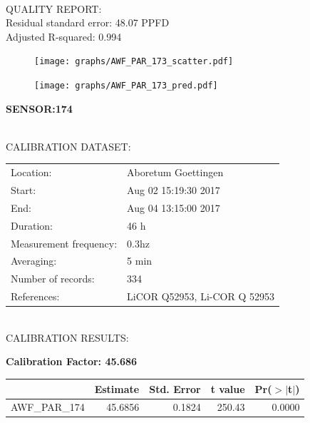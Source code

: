 \documentclass[oneside]{report}
\begin{document}
\hrulefill\\
QUALITY REPORT:\\
Residual standard error: 48.07 PPFD\\
Adjusted R-squared: 0.994



\begin{figure}[H]
  \centering
  \texttt{[image: graphs/AWF\_PAR\_173\_scatter.pdf]}
\end{figure}




\begin{figure}[H]
  \centering
  \texttt{[image: graphs/AWF\_PAR\_173\_pred.pdf]}
\end{figure}

\pagebreak


\begin{center}
\large{\textbf{SENSOR:174}}\\
\end{center}

\hrulefill\\
CALIBRATION DATASET:\\
\begin{table}[h!]
  \centering
  \label{tab:table1}
  \begin{tabular}{ll}
    Location: & Aboretum Goettingen\\ 
    
    
    Start:  & Aug 02 15:19:30 2017 \\
    End:   & Aug 04 13:15:00 2017\\ 
    Duration: & 46 h\\
    Measurement frequency: & 0.3hz\\
    Averaging:  &5 min\\
    Number of records: & 334 \\
    References: & LiCOR Q52953, Li-COR Q 52953 \\
  \end{tabular}
\end{table}

\hrulefill\\
CALIBRATION RESULTS:\\


\begin{center}
\textbf{\large{Calibration Factor: 45.686}}\\
\end{center}
\begin{table}[ht]
\centering
\begin{tabular}{rrrrr}
  \hline
 & Estimate & Std. Error & t value & Pr($>$$|$t$|$) \\ 
  \hline
AWF\_PAR\_174 & 45.6856 & 0.1824 & 250.43 & 0.0000 \\ 
   \hline
\end{tabular}
\end{table}
\end{document}
